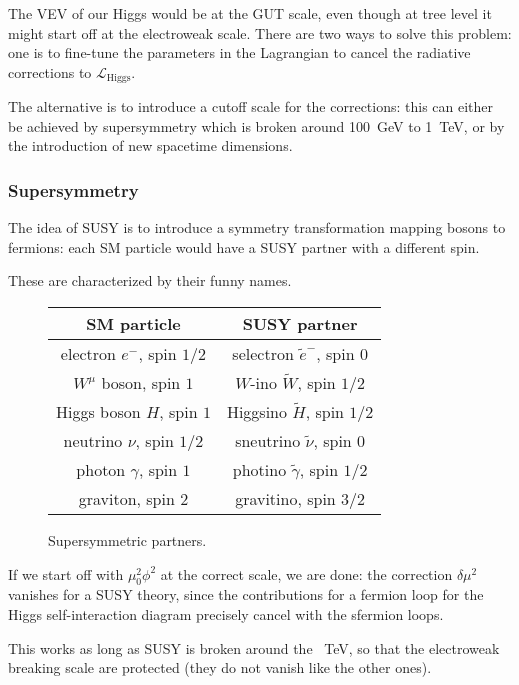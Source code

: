 \documentclass[main.tex]{subfiles}
\begin{document}
The VEV of our Higgs would be at the GUT scale, even though at tree level it might start off at the electroweak scale. 
There are two ways to solve this problem: 
one is to fine-tune the parameters in the Lagrangian to cancel the radiative corrections to \(\mathscr{L} _{\text{Higgs}}\). 

The alternative is to introduce a cutoff scale for the corrections: this can either be achieved by supersymmetry which is broken around \SI{100}{GeV} to \SI{1}{TeV}, or by the introduction of new spacetime dimensions.

\subsubsection{Supersymmetry}

The idea of SUSY is to introduce a symmetry transformation mapping bosons to fermions: each SM particle would have a SUSY partner with a different spin. 

These are characterized by their funny names.
\begin{figure}
\begin{tabular}{cc}
SM particle & SUSY partner\\
\hline
electron \(e^{-}\), spin \(1/2\) & selectron \(\widetilde{e}^{-}\), spin \(0\) \\
\(W^{\mu }\) boson, spin \(1\) & \(W\)-ino \(\widetilde{W}\), spin \(1/2\) \\
Higgs boson \(H\), spin \(1\) & Higgsino \(\widetilde{H}\), spin \(1/2\) \\
neutrino \(\nu \), spin \(1/2\) & sneutrino \(\widetilde{\nu }\), spin \(0\) \\
photon \(\gamma  \), spin \(1\) & photino \(\widetilde{\gamma  }\), spin \(1/2\) \\
graviton, spin \(2\) & gravitino, spin \(3/2\) 
\end{tabular}
\label{tab:supersymmetric-partners}
\caption{Supersymmetric partners.}
\end{figure}

If we start off with \(\mu_0^2 \phi^2\) at the correct scale, we are done: the correction \(\delta \mu^2\) vanishes for a SUSY theory, since the contributions for a fermion loop for the Higgs self-interaction diagram precisely cancel with the sfermion loops. 

This works as long as SUSY is broken around the \SI{}{TeV}, so that the electroweak breaking scale are protected (they do not vanish like the other ones). 
\end{document}
